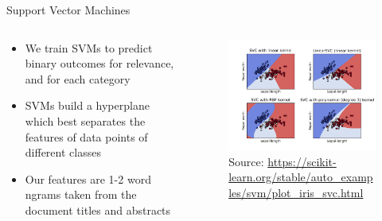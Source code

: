 \documentclass[9pt]{beamer}
\begin{document}
\begin{frame}{Support Vector Machines}
\begin{columns}
	\begin{column}{0.5\linewidth}
	\begin{itemize}
		\item We train SVMs to predict binary outcomes for relevance, and for each category
		\item SVMs build a hyperplane which best separates the features of data points of different classes
		\item Our features are 1-2 word ngrams taken from the document titles and abstracts
	\end{itemize}
	\end{column}
	\begin{column}{0.5\linewidth}
	\begin{figure}
		\includegraphics[width=\linewidth]{images/svc_sklearn}
		\caption{Source: \url{https://scikit-learn.org/stable/auto_examples/svm/plot_iris_svc.html}}
	\end{figure}
	\end{column}
\end{columns}

\end{frame}

%
%
%
%		
\end{document}
